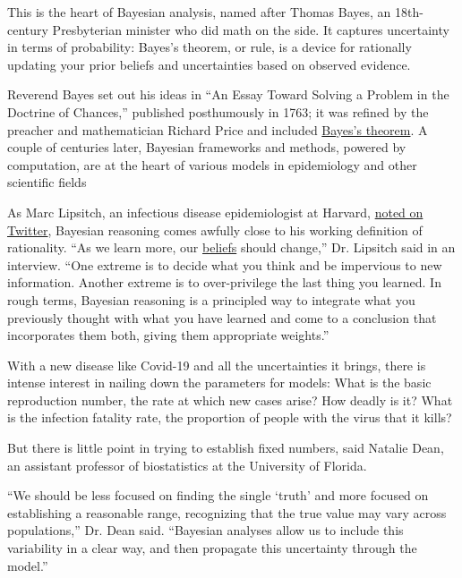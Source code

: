 This is the heart of Bayesian analysis, named after Thomas Bayes, an
18th-century Presbyterian minister who did math on the side. It captures
uncertainty in terms of probability: Bayes's theorem, or rule, is a
device for rationally updating your prior beliefs and uncertainties
based on observed evidence.

Reverend Bayes set out his ideas in ``An Essay Toward Solving a Problem
in the Doctrine of Chances,'' published posthumously in 1763; it was
refined by the preacher and mathematician Richard Price and included
\href{https://www.nytimes.com/2011/08/07/books/review/the-theory-that-would-not-die-by-sharon-bertsch-mcgrayne-book-review.html?searchResultPosition=7}{Bayes's
theorem}. A couple of centuries later, Bayesian frameworks and methods,
powered by computation, are at the heart of various models in
epidemiology and other scientific fields

As Marc Lipsitch, an infectious disease epidemiologist at Harvard,
\href{https://twitter.com/mlipsitch/status/1257858402186940421}{noted on
Twitter}, Bayesian reasoning comes awfully close to his working
definition of rationality. ``As we learn more, our
\href{https://twitter.com/CT_Bergstrom/status/1276742731948158976}{beliefs}
should change,'' Dr. Lipsitch said in an interview. ``One extreme is to
decide what you think and be impervious to new information. Another
extreme is to over-privilege the last thing you learned. In rough terms,
Bayesian reasoning is a principled way to integrate what you previously
thought with what you have learned and come to a conclusion that
incorporates them both, giving them appropriate weights.''

With a new disease like Covid-19 and all the uncertainties it brings,
there is intense interest in nailing down the parameters for models:
What is the basic reproduction number, the rate at which new cases
arise? How deadly is it? What is the infection fatality rate, the
proportion of people with the virus that it kills?

But there is little point in trying to establish fixed numbers, said
Natalie Dean, an assistant professor of biostatistics at the University
of Florida.

``We should be less focused on finding the single `truth' and more
focused on establishing a reasonable range, recognizing that the true
value may vary across populations,'' Dr. Dean said. ``Bayesian analyses
allow us to include this variability in a clear way, and then propagate
this uncertainty through the model.''

